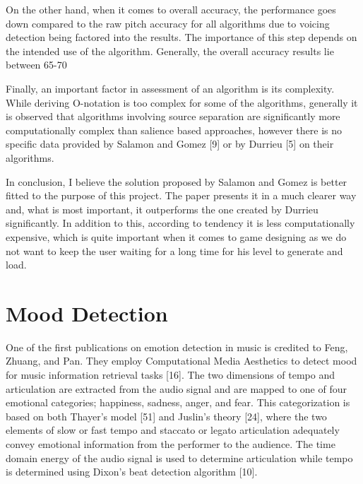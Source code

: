 On the other hand, when it comes to overall accuracy, the performance goes down compared to the raw pitch accuracy for all algorithms due to voicing detection being factored into the results. The importance of this step depends on the intended use of the algorithm. Generally, the overall accuracy results lie between 65-70%

Finally, an important factor in assessment of an algorithm is its complexity. While deriving O-notation is too complex for some of the algorithms, generally it is observed that algorithms involving source separation are significantly more computationally complex than salience based approaches, however there is no specific data provided by Salamon and Gomez [9] or by Durrieu [5] on their algorithms.

In conclusion, I believe the solution proposed by Salamon and Gomez is better fitted to the purpose of this project. The paper presents it in a much clearer way and, what is most important, it outperforms the one created by Durrieu significantly. In addition to this, according to tendency it is less computationally expensive, which is quite important when it comes to game designing as we do not want to keep the user waiting for a long time for his level to generate and load.

\section{Mood Detection}


One of the first publications on emotion detection in music is credited to Feng, Zhuang, and Pan. They employ Computational Media Aesthetics to detect mood for music information retrieval tasks [16]. The two dimensions of tempo and articulation are extracted from the audio signal and are mapped to one of four emotional categories; happiness, sadness, anger, and fear. This categorization is based on both Thayer's model [51] and Juslin's theory [24], where the two elements of slow or fast tempo and staccato or legato articulation adequately convey emotional information from the performer to the audience. The time domain energy of the audio signal is used to determine articulation while tempo is determined using Dixon's beat detection algorithm [10].
